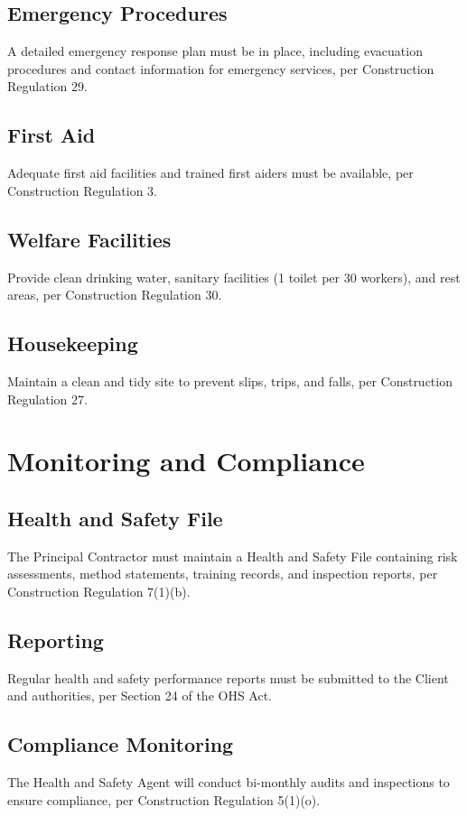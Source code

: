 \documentclass[11pt]{article}
\begin{document}
\subsection{Emergency Procedures}
A detailed emergency response plan must be in place, including evacuation procedures and contact information for emergency services, per Construction Regulation 29.

\subsection{First Aid}
Adequate first aid facilities and trained first aiders must be available, per Construction Regulation 3.

\subsection{Welfare Facilities}
Provide clean drinking water, sanitary facilities (1 toilet per 30 workers), and rest areas, per Construction Regulation 30.

\subsection{Housekeeping}
Maintain a clean and tidy site to prevent slips, trips, and falls, per Construction Regulation 27.

\section{Monitoring and Compliance}
\subsection{Health and Safety File}
The Principal Contractor must maintain a Health and Safety File containing risk assessments, method statements, training records, and inspection reports, per Construction Regulation 7(1)(b).

\subsection{Reporting}
Regular health and safety performance reports must be submitted to the Client and authorities, per Section 24 of the OHS Act.

\subsection{Compliance Monitoring}
The Health and Safety Agent will conduct bi-monthly audits and inspections to ensure compliance, per Construction Regulation 5(1)(o).
\end{document}

